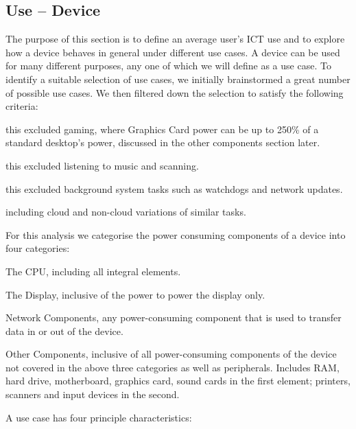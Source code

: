 \documentclass[conference]{IEEEtran}
\begin{document}
\subsection{Use -- Device}

The purpose of this section is to define an average user's ICT use and
to explore how a device behaves in general under different use cases.
A device can be used for many different purposes, any one of which we
will define as a use case.  To identify a suitable selection of use
cases, we initially brainstormed a great number of possible use
cases. We then filtered down the selection to satisfy the following
criteria:

 this excluded gaming, where Graphics Card power
can be up to 250\% of a standard desktop’s power, discussed in the
other components section later.

 this
excluded listening to music and scanning.

 this excluded background system tasks such as
watchdogs and network updates.

 including cloud
and non-cloud variations of similar tasks.

For this analysis we categorise the power consuming components of
a device into four categories:

\begin{compactitem}
\item The CPU, including all integral elements.
\item The Display, inclusive of the power to power the display only.
\item Network Components, any power-consuming component that is used to transfer data in or out of the device.
\item Other Components, inclusive of all power-consuming components
  of the device not covered in the above three categories as well as
  peripherals. Includes RAM, hard drive, motherboard, graphics
  card, sound cards in the first element; printers, scanners and input
  devices in the second.
\end{compactitem}

A use case has four principle characteristics:
\end{document}
